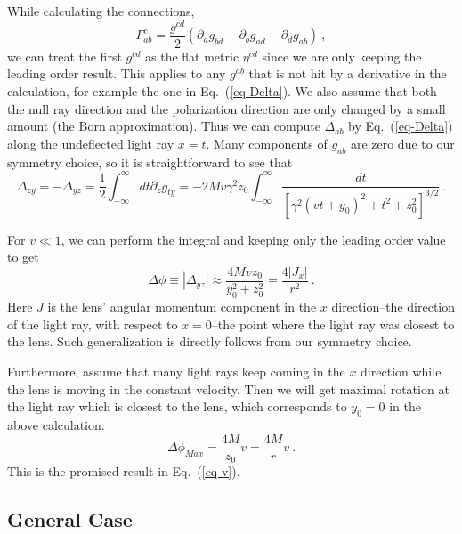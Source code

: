\documentclass[aps,showpacs,onecolumn,floats,prd,superscriptaddress,nofootinbib]{revtex4}
\begin{document}
While calculating the connections,
\begin{equation}
\Gamma_{ab}^c = \frac{g^{cd}}{2}\left(\partial_a g_{bd} + \partial_b g_{ad} - \partial_d g_{ab} \right)~,
\end{equation}
we can treat the first $g^{cd}$ as the flat metric $\eta^{cd}$ since we are only keeping the leading order result. 
This applies to any $g^{ab}$ that is not hit by a derivative in the calculation, for example the one in Eq.~(\ref{eq-Delta}).
We also assume that both the null ray direction and the polarization direction are only changed by a small amount (the Born approximation). 
Thus we can compute $\Delta_{ab}$ by Eq.~(\ref{eq-Delta}) along the undeflected light ray $x=t$.
Many components of $g_{ab}$ are zero due to our symmetry choice, so it is straightforward to see that
\begin{equation}
\Delta_{zy} = -\Delta_{yz} = \frac{1}{2}\int_{-\infty}^{\infty} dt \partial_z g_{ty}
=-2Mv\gamma^2 z_0 \int_{-\infty}^{\infty}
\frac{dt}{\left[\gamma^2(vt+y_0)^2+t^2 + z_0^2\right]^{3/2}}~.
\end{equation}

For $v\ll1$, we can perform the integral and keeping only the leading order value to get 
\begin{equation}
\Delta\phi \equiv |\Delta_{yz}| \approx \frac{4Mvz_0}{y_0^2 + z_0^2}
= \frac{4|J_x|}{r^2}~.
\end{equation}
Here $J$ is the lens' angular momentum component in the $x$ direction--the direction of the light ray, with respect to $x=0$--the point where the light ray was closest to the lens. Such generalization is directly follows from our symmetry choice.

Furthermore, assume that many light rays keep coming in the $x$ direction while the lens is moving in the constant velocity.
Then we will get maximal rotation at the light ray which is closest to the lens, which corresponds to $y_0=0$ in the above calculation.
\begin{equation}
\Delta \phi_{Max} = \frac{4M}{z_0}v = \frac{4M}{r}v~.
\end{equation}
This is the promised result in Eq.~(\ref{eq-v}).

\subsection{General Case}
\end{document}
